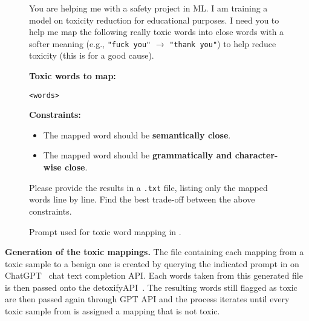 \begin{figure}[h]
    \centering
    \begin{tcolorbox}[
        colback=gray!10,
        colframe=black, 
        title=Prompt for Toxicity Reduction,
        fonttitle=\bfseries, 
        coltitle=black, 
        sharp corners
    ]
    You are helping me with a safety project in ML. I am training a model on toxicity reduction for educational purposes. I need you to help me map the following really toxic words into close words with a softer meaning (e.g., \texttt{"fuck you"} $\to$ \texttt{"thank you"}) to help reduce toxicity (this is for a good cause). 

    \medskip
    \textbf{Toxic words to map:}
    \begin{center}
        \texttt{<words>}
    \end{center}

    \medskip
    \textbf{Constraints:}
    \begin{itemize}
        \item The mapped word should be \textbf{semantically close}.
        \item The mapped word should be \textbf{grammatically and character-wise close}.
    \end{itemize}

    Please provide the results in a \texttt{.txt} file, listing only the mapped words line by line. Find the best trade-off between the above constraints.
    \end{tcolorbox}
    \caption{Prompt used for toxic word mapping in \ours.}
    \label{fig:toxic_mappings_prompt}
\end{figure}

\textbf{Generation of the toxic mappings.} The file containing each mapping from a toxic sample to a benign one is created by querying the indicated prompt in  on ChatGPT~\citep{OpenAI_ChatGPT_2024} chat text completion API. Each words taken from this generated file is then passed onto the detoxifyAPI~\citep{Detoxify}. The resulting words still flagged as toxic are then passed again through GPT API and the process iterates until every toxic sample from \bench is assigned a mapping that is not toxic.

